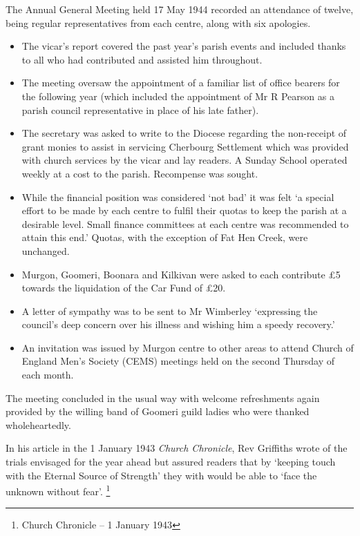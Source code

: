 The Annual General Meeting held 17 May 1944 recorded an attendance of
twelve, being regular representatives from each centre, along with six
apologies.

\begin{itemize}
\item
  The vicar's report covered the past year's parish events and included
  thanks to all who had contributed and assisted him throughout.
\item
  The meeting oversaw the appointment of a familiar list of office
  bearers for the following year (which included the appointment of Mr R
  Pearson as a parish council representative in place of his late
  father).
\item
  The secretary was asked to write to the Diocese regarding the
  non-receipt of grant monies to assist in servicing Cherbourg
  Settlement which was provided with church services by the vicar and
  lay readers. A Sunday School operated weekly at a cost to the parish.
  Recompense was sought.
\item
  While the financial position was considered `not bad' it was felt `a
  special effort to be made by each centre to fulfil their quotas to
  keep the parish at a desirable level. Small finance committees at each
  centre was recommended to attain this end.' Quotas, with the exception
  of Fat Hen Creek, were unchanged.
\item
  Murgon, Goomeri, Boonara and Kilkivan were asked to each contribute £5
  towards the liquidation of the Car Fund of £20.
\item
  A letter of sympathy was to be sent to Mr Wimberley `expressing the
  council's deep concern over his illness and wishing him a speedy
  recovery.'
\item
  An invitation was issued by Murgon centre to other areas to attend
  Church of England Men's Society (CEMS) meetings held on the second
  Thursday of each month.
\end{itemize}

The meeting concluded in the usual way with welcome refreshments again
provided by the willing band of Goomeri guild ladies who were thanked
wholeheartedly.

In his article in the 1 January 1943 \emph{Church Chronicle}, Rev
Griffiths wrote of the trials envisaged for the year ahead but assured
readers that by `keeping touch with the Eternal Source of Strength' they
with would be able to `face the unknown without fear'. \footnote{Church
  Chronicle -- 1 January 1943}

